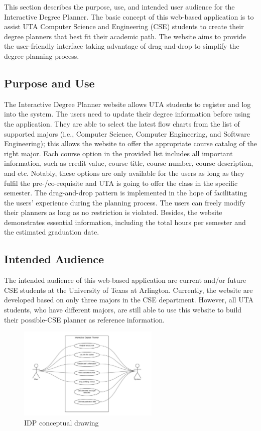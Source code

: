 This section describes the purpose, use, and intended user audience for the Interactive Degree Planner. The basic concept of this web-based application is to assist UTA Computer Science and Engineering (CSE) students to create their degree planners that best fit their academic path. The website aims to provide the user-friendly interface taking advantage of drag-and-drop to simplify the degree planning process.

\subsection{Purpose and Use}
The Interactive Degree Planner website allows UTA students to register and log into the system. The users need to update their degree information before using the application. They are able to select the latest flow charts from the list of supported majors (i.e., Computer Science, Computer Engineering, and Software Engineering); this allows the website to offer the appropriate course catalog of the right major. Each course option in the provided list includes all important information, such as credit value, course title, course number, course description, and etc. Notably, these options are only available for the users as long as they fulfil the pre-/co-requisite and UTA is going to offer the class in the specific semester. The drag-and-drop pattern is implemented in the hope of facilitating the users' experience during the planning process. The users can freely modify their planners as long as no restriction is violated. Besides, the website  demonstrates essential information, including the total hours per semester and the estimated graduation date.

\subsection{Intended Audience}
The intended audience of this web-based application are current and/or future CSE students at the University of Texas at Arlington. Currently, the website are developed based on only three majors in the CSE department. However, all UTA students, who have different majors, are still able to use this website to build their possible-CSE planner as reference information.

\begin{figure}[h!]
	\centering
   	\includegraphics[width=0.60\textwidth]{images/uml}
    \caption{IDP conceptual drawing}
\end{figure}
